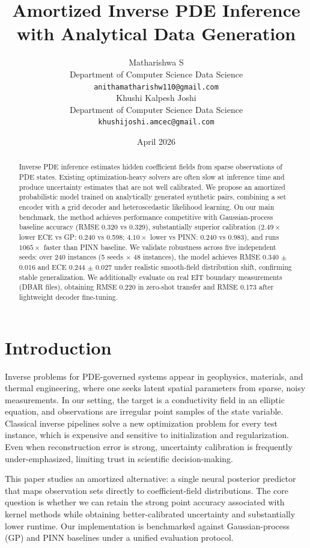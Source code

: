\documentclass{article}
\title{Amortized Inverse PDE Inference with Analytical Data Generation}
\author{
  Matharishwa S \\
  Department of Computer Science Data Science \\
  \texttt{anithamatharishw110@gmail.com} \\
  \And
  Khushi Kalpesh Joshi \\
  Department of Computer Science Data Science \\
  \texttt{khushijoshi.amcec@gmail.com} \\
}
\date{April 2026}
\begin{document}
\maketitle

\begin{abstract}
Inverse PDE inference estimates hidden coefficient fields from sparse observations of PDE states. Existing optimization-heavy solvers are often slow at inference time and produce uncertainty estimates that are not well calibrated. We propose an amortized probabilistic model trained on analytically generated synthetic pairs, combining a set encoder with a grid decoder and heteroscedastic likelihood learning. On our main benchmark, the method achieves performance competitive with Gaussian-process baseline accuracy (RMSE 0.320 vs 0.329), substantially superior calibration ($2.49\times$ lower ECE vs GP: 0.240 vs 0.598; $4.10\times$ lower vs PINN: 0.240 vs 0.983), and runs $1065\times$ faster than PINN baseline. We validate robustness across five independent seeds: over 240 instances (5 seeds $\times$ 48 instances), the model achieves RMSE 0.340 $\pm$ 0.016 and ECE 0.244 $\pm$ 0.027 under realistic smooth-field distribution shift, confirming stable generalization. We additionally evaluate on real EIT boundary measurements (DBAR files), obtaining RMSE 0.220 in zero-shot transfer and RMSE 0.173 after lightweight decoder fine-tuning.
\end{abstract}

\section{Introduction}
Inverse problems for PDE-governed systems appear in geophysics, materials, and thermal engineering, where one seeks latent spatial parameters from sparse, noisy measurements. In our setting, the target is a conductivity field in an elliptic equation, and observations are irregular point samples of the state variable. Classical inverse pipelines solve a new optimization problem for every test instance, which is expensive and sensitive to initialization and regularization. Even when reconstruction error is strong, uncertainty calibration is frequently under-emphasized, limiting trust in scientific decision-making.

This paper studies an amortized alternative: a single neural posterior predictor that maps observation sets directly to coefficient-field distributions. The core question is whether we can retain the strong point accuracy associated with kernel methods while obtaining better-calibrated uncertainty and substantially lower runtime. Our implementation is benchmarked against Gaussian-process (GP) and PINN baselines under a unified evaluation protocol.
\end{document}
